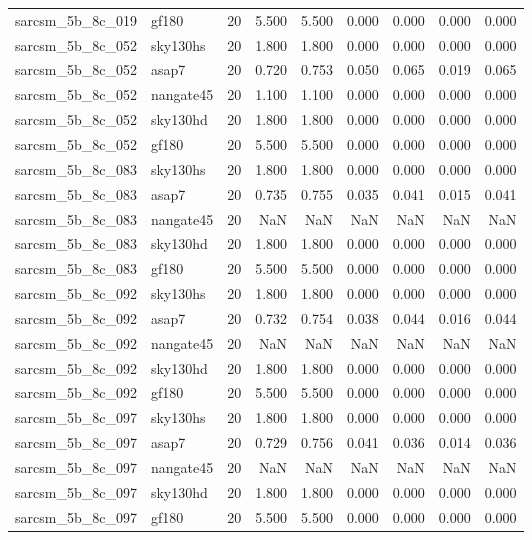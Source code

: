 \begin{tabular}{llrrrrrrr}
sarcsm\_5b\_8c\_019 & gf180 & 20 & 5.500 & 5.500 & 0.000 & 0.000 & 0.000 & 0.000 \\
sarcsm\_5b\_8c\_052 & sky130hs & 20 & 1.800 & 1.800 & 0.000 & 0.000 & 0.000 & 0.000 \\
sarcsm\_5b\_8c\_052 & asap7 & 20 & 0.720 & 0.753 & 0.050 & 0.065 & 0.019 & 0.065 \\
sarcsm\_5b\_8c\_052 & nangate45 & 20 & 1.100 & 1.100 & 0.000 & 0.000 & 0.000 & 0.000 \\
sarcsm\_5b\_8c\_052 & sky130hd & 20 & 1.800 & 1.800 & 0.000 & 0.000 & 0.000 & 0.000 \\
sarcsm\_5b\_8c\_052 & gf180 & 20 & 5.500 & 5.500 & 0.000 & 0.000 & 0.000 & 0.000 \\
sarcsm\_5b\_8c\_083 & sky130hs & 20 & 1.800 & 1.800 & 0.000 & 0.000 & 0.000 & 0.000 \\
sarcsm\_5b\_8c\_083 & asap7 & 20 & 0.735 & 0.755 & 0.035 & 0.041 & 0.015 & 0.041 \\
sarcsm\_5b\_8c\_083 & nangate45 & 20 & NaN & NaN & NaN & NaN & NaN & NaN \\
sarcsm\_5b\_8c\_083 & sky130hd & 20 & 1.800 & 1.800 & 0.000 & 0.000 & 0.000 & 0.000 \\
sarcsm\_5b\_8c\_083 & gf180 & 20 & 5.500 & 5.500 & 0.000 & 0.000 & 0.000 & 0.000 \\
sarcsm\_5b\_8c\_092 & sky130hs & 20 & 1.800 & 1.800 & 0.000 & 0.000 & 0.000 & 0.000 \\
sarcsm\_5b\_8c\_092 & asap7 & 20 & 0.732 & 0.754 & 0.038 & 0.044 & 0.016 & 0.044 \\
sarcsm\_5b\_8c\_092 & nangate45 & 20 & NaN & NaN & NaN & NaN & NaN & NaN \\
sarcsm\_5b\_8c\_092 & sky130hd & 20 & 1.800 & 1.800 & 0.000 & 0.000 & 0.000 & 0.000 \\
sarcsm\_5b\_8c\_092 & gf180 & 20 & 5.500 & 5.500 & 0.000 & 0.000 & 0.000 & 0.000 \\
sarcsm\_5b\_8c\_097 & sky130hs & 20 & 1.800 & 1.800 & 0.000 & 0.000 & 0.000 & 0.000 \\
sarcsm\_5b\_8c\_097 & asap7 & 20 & 0.729 & 0.756 & 0.041 & 0.036 & 0.014 & 0.036 \\
sarcsm\_5b\_8c\_097 & nangate45 & 20 & NaN & NaN & NaN & NaN & NaN & NaN \\
sarcsm\_5b\_8c\_097 & sky130hd & 20 & 1.800 & 1.800 & 0.000 & 0.000 & 0.000 & 0.000 \\
sarcsm\_5b\_8c\_097 & gf180 & 20 & 5.500 & 5.500 & 0.000 & 0.000 & 0.000 & 0.000 \\

\end{tabular}
